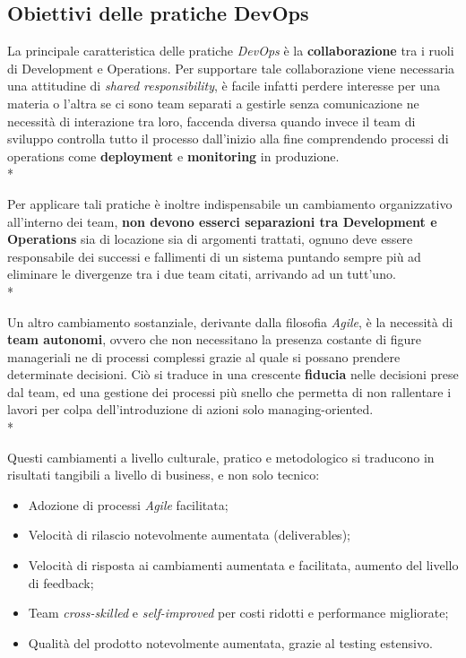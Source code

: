 \documentclass[../main.tex]{subfiles}
\begin{document}
        	\subsection{Obiettivi delle pratiche DevOps}
        	
        		La principale caratteristica delle pratiche \emph{DevOps}\cite{devops_culture} è la \textbf{collaborazione} tra i ruoli di Development e Operations.
        		Per supportare tale collaborazione viene necessaria una attitudine di \emph{shared responsibility}, è facile infatti perdere interesse per una materia o l'altra se ci sono team separati a gestirle senza comunicazione ne necessità di interazione tra loro, faccenda diversa quando invece il team di sviluppo controlla tutto il processo dall'inizio alla fine comprendendo processi di operations come \textbf{deployment} e \textbf{monitoring} in produzione.\\*
        		
        		Per applicare tali pratiche è inoltre indispensabile un cambiamento organizzativo all'interno dei team, \textbf{non devono esserci separazioni tra Development e Operations} sia di locazione sia di argomenti trattati, ognuno deve essere responsabile dei successi e fallimenti di un sistema puntando sempre più ad eliminare le divergenze tra i due team citati, arrivando ad un tutt'uno.\\*
        		
        		Un altro cambiamento sostanziale, derivante dalla filosofia \emph{Agile}, è la necessità di \textbf{team autonomi}, ovvero che non necessitano la presenza costante di figure manageriali ne di processi complessi grazie al quale si possano prendere determinate decisioni. Ciò si traduce in una crescente \textbf{fiducia} nelle decisioni prese dal team, ed una gestione dei processi più snello che permetta di non rallentare i lavori per colpa dell'introduzione di azioni solo managing-oriented.\\*
        	
        		Questi cambiamenti a livello culturale, pratico e metodologico si traducono in risultati tangibili a livello di business, e non solo tecnico:
        		\begin{itemize}
        			\item Adozione di processi \emph{Agile} facilitata;
        			\item Velocità di rilascio notevolmente aumentata (deliverables);
        			\item Velocità di risposta ai cambiamenti aumentata e facilitata, aumento del livello di feedback;
        			\item Team \emph{cross-skilled} e \emph{self-improved} per costi ridotti e performance migliorate;
        			\item Qualità del prodotto notevolmente aumentata, grazie al testing estensivo.
        		\end{itemize}
        	
\end{document}
